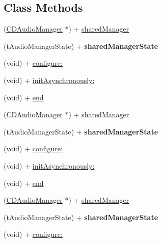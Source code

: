 \subsection*{Class Methods}
\begin{DoxyCompactItemize}
\item 
(\hyperlink{interfaceCDAudioManager}{C\+D\+Audio\+Manager} $\ast$) + \hyperlink{interfaceCDAudioManager_a757b69bd4a902166b3ffa81ea85ba6e8}{shared\+Manager}
\item 
\mbox{\label{interfaceCDAudioManager_a836401e9feed55d2276e880e5aca13fa}} 
(t\+Audio\+Manager\+State) + {\bfseries shared\+Manager\+State}
\item 
(void) + \hyperlink{interfaceCDAudioManager_a4565c81bdaefd40cad943440c7a438ab}{configure\+:}
\item 
(void) + \hyperlink{interfaceCDAudioManager_a208d173cd07d3ace248aff4bb16839b9}{init\+Asynchronously\+:}
\item 
(void) + \hyperlink{interfaceCDAudioManager_a0d1e25778a1823456c3d65219a7d0562}{end}
\item 
(\hyperlink{interfaceCDAudioManager}{C\+D\+Audio\+Manager} $\ast$) + \hyperlink{interfaceCDAudioManager_a757b69bd4a902166b3ffa81ea85ba6e8}{shared\+Manager}
\item 
\mbox{\label{interfaceCDAudioManager_a836401e9feed55d2276e880e5aca13fa}} 
(t\+Audio\+Manager\+State) + {\bfseries shared\+Manager\+State}
\item 
(void) + \hyperlink{interfaceCDAudioManager_a4565c81bdaefd40cad943440c7a438ab}{configure\+:}
\item 
(void) + \hyperlink{interfaceCDAudioManager_a208d173cd07d3ace248aff4bb16839b9}{init\+Asynchronously\+:}
\item 
(void) + \hyperlink{interfaceCDAudioManager_a0d1e25778a1823456c3d65219a7d0562}{end}
\item 
(\hyperlink{interfaceCDAudioManager}{C\+D\+Audio\+Manager} $\ast$) + \hyperlink{interfaceCDAudioManager_a757b69bd4a902166b3ffa81ea85ba6e8}{shared\+Manager}
\item 
\mbox{\label{interfaceCDAudioManager_a836401e9feed55d2276e880e5aca13fa}} 
(t\+Audio\+Manager\+State) + {\bfseries shared\+Manager\+State}
\item 
(void) + \hyperlink{interfaceCDAudioManager_a4565c81bdaefd40cad943440c7a438ab}{configure\+:}

\end{DoxyCompactItemize}
